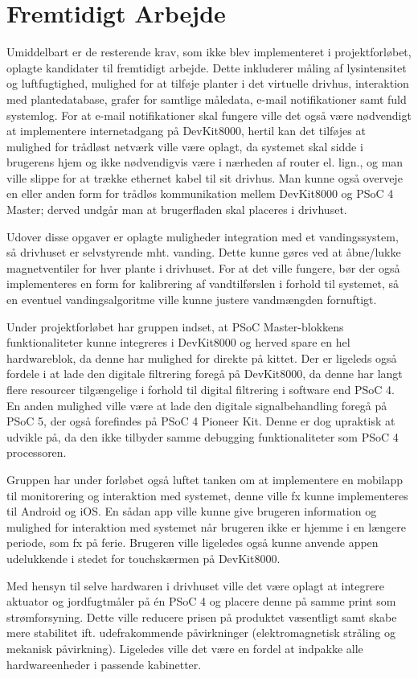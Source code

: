 \section{Fremtidigt Arbejde} \label{ch:Fremtidigt_arbejde}

Umiddelbart er de resterende krav, som ikke blev implementeret i projektforløbet, oplagte kandidater til fremtidigt arbejde.
Dette inkluderer måling af lysintensitet og luftfugtighed, mulighed for at tilføje planter i det virtuelle drivhus, interaktion med plantedatabase, grafer for samtlige måledata, e-mail notifikationer samt fuld systemlog.
For at e-mail notifikationer skal fungere ville det også være nødvendigt at implementere internetadgang på DevKit8000, hertil kan det tilføjes at mulighed for trådløst netværk ville være oplagt, da systemet skal sidde i brugerens hjem og ikke nødvendigvis være i nærheden af router el. lign., og man ville slippe for at trække ethernet kabel til sit drivhus.
Man kunne også overveje en eller anden form for trådløs kommunikation mellem DevKit8000 og PSoC 4 Master; derved undgår man at brugerfladen skal placeres i drivhuset. 

Udover disse opgaver er oplagte muligheder integration med et vandingssystem, så drivhuset er selvstyrende mht. vanding. 
Dette kunne gøres ved at åbne/lukke magnetventiler for hver plante i drivhuset. 
For at det ville fungere, bør der også implementeres en form for kalibrering af vandtilførslen i forhold til systemet, så en eventuel vandingsalgoritme ville kunne justere vandmængden fornuftigt.

Under projektforløbet har gruppen indset, at PSoC Master-blokkens funktionaliteter kunne integreres i DevKit8000 og herved spare en hel hardwareblok, da denne har mulighed for \IIC direkte på kittet.
Der er ligeleds også fordele i at lade den digitale filtrering foregå på DevKit8000, da denne har langt flere resourcer tilgængelige i forhold til digital filtrering i software end PSoC 4.
En anden mulighed ville være at lade den digitale signalbehandling foregå på PSoC 5, der også forefindes på PSoC 4 Pioneer Kit.
Denne er dog upraktisk at udvikle på, da den ikke tilbyder samme debugging funktionaliteter som PSoC 4 processoren.

Gruppen har under forløbet også luftet tanken om at implementere en mobilapp til monitorering og interaktion med systemet, denne ville fx kunne implementeres til Android og iOS.
En sådan app ville kunne give brugeren information og mulighed for interaktion med systemet når brugeren ikke er hjemme i en længere periode, som fx på ferie.
Brugeren ville ligeledes også kunne anvende appen udelukkende i stedet for touchskærmen på DevKit8000.

Med hensyn til selve hardwaren i drivhuset ville det være oplagt at integrere aktuator og jordfugtmåler på én PSoC 4 og placere denne på samme print som strømforsyning. 
Dette ville reducere prisen på produktet væsentligt samt skabe mere stabilitet ift. udefrakommende påvirkninger (elektromagnetisk stråling og mekanisk påvirkning).
Ligeledes ville det være en fordel at indpakke alle hardwareenheder i passende kabinetter.